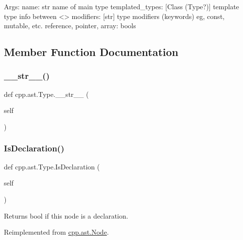\begin{DoxyVerb}Args:
  name: str name of main type
  templated_types: [Class (Type?)] template type info between <>
  modifiers: [str] type modifiers (keywords) eg, const, mutable, etc.
  reference, pointer, array: bools
\end{DoxyVerb}
 

\subsection{Member Function Documentation}
\mbox{\label{classcpp_1_1ast_1_1Type_a1a10eff21f6150b7e14bde3788fa069b}} 
\subsubsection{\texorpdfstring{\_\_str\_\_()}{\_\_str\_\_()}}
{\footnotesize\ttfamily def cpp.\+ast.\+Type.\+\_\+\+\_\+str\+\_\+\+\_\+ (\begin{DoxyParamCaption}\item[{}]{self }\end{DoxyParamCaption})}

\mbox{\label{classcpp_1_1ast_1_1Type_a590071a2bce7ea5140d7eb86c90f63bf}} 
\subsubsection{\texorpdfstring{IsDeclaration()}{IsDeclaration()}}
{\footnotesize\ttfamily def cpp.\+ast.\+Type.\+Is\+Declaration (\begin{DoxyParamCaption}\item[{}]{self }\end{DoxyParamCaption})}

\begin{DoxyVerb}Returns bool if this node is a declaration.\end{DoxyVerb}
 

Reimplemented from \mbox{\hyperlink{classcpp_1_1ast_1_1Node_ab3eca703a79fb65bc25dfbcb7547c79e}{cpp.\+ast.\+Node}}.

\mbox{\label{classcpp_1_1ast_1_1Type_aedff25dc3736e83388742e55fe29159b}} 
